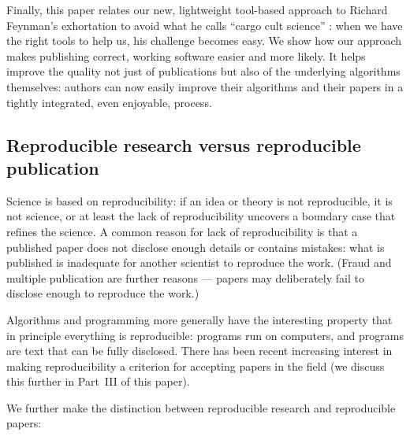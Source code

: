 \documentclass[preprint,times]{elsarticle}
\begin{document}
Finally, this paper relates our new, lightweight tool-based approach to Richard Feynman's exhortation to avoid what he calls ``cargo cult science'' \cite{feynman}: when we have the right tools to help us, his challenge becomes easy. We show how our approach makes publishing correct, working software easier and more likely. It helps improve the quality not just of publications but also of the underlying algorithms themselves: authors can now easily improve their algorithms and their papers in a tightly integrated, even enjoyable, process.
 
\subsection{Reproducible research versus reproducible publication}
Science is based on reproducibility: if an idea or theory is not reproducible, it is not science, or at least the lack of reproducibility uncovers a boundary case that refines the science. A common reason for lack of reproducibility is that a published paper does not disclose enough details or contains mistakes: what is published is inadequate for another scientist to reproduce the work. (Fraud and multiple publication are further reasons --- papers may deliberately fail to disclose enough to reproduce the work.)

Algorithms and programming more generally have the interesting property that in principle everything is reproducible: programs run on computers, and programs are text that can be fully disclosed. There has been recent increasing interest in making reproducibility a criterion for accepting papers in the field (we discuss this further in Part~III of this paper).

We further make the distinction between reproducible research and reproducible papers:
\end{document}
